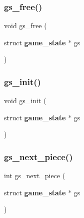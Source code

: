 \mbox{\label{game__state_8h_ac5fb586f3c5c1944e06cebb422811313}} 
\subsubsection{gs\+\_\+free()}
{\footnotesize\ttfamily void gs\+\_\+free (\begin{DoxyParamCaption}\item[{struct \textbf{ game\+\_\+state} $\ast$}]{gs }\end{DoxyParamCaption})\hspace{0.3cm}{\ttfamily [inline]}}

\mbox{\label{game__state_8h_af05255e813cc97e090bf3abcdb0348ce}} 
\subsubsection{gs\+\_\+init()}
{\footnotesize\ttfamily void gs\+\_\+init (\begin{DoxyParamCaption}\item[{struct \textbf{ game\+\_\+state} $\ast$}]{gs }\end{DoxyParamCaption})\hspace{0.3cm}{\ttfamily [inline]}}

\mbox{\label{game__state_8h_ad9732608b1a3947bc6741965ab3aabe2}} 
\subsubsection{gs\+\_\+next\+\_\+piece()}
{\footnotesize\ttfamily int gs\+\_\+next\+\_\+piece (\begin{DoxyParamCaption}\item[{struct \textbf{ game\+\_\+state} $\ast$}]{gs }\end{DoxyParamCaption})\hspace{0.3cm}{\ttfamily [inline]}}

